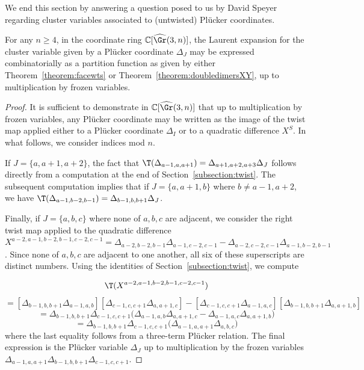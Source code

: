 We end this section by answering a question posed to us by David Speyer regarding cluster variables associated to (untwisted) Pl\"ucker coordinates.

\begin{prop}
\label{prop:untwisted}
For any $n\geq 4$, in the coordinate ring $\mathbb{C}[\widehat{\Gr}(3,n)]$, the Laurent expansion for the cluster variable given by a Pl\"ucker coordinate $\Delta_J$ may be expressed combinatorially as a partition function as given by either Theorem~\ref{theorem:facewts} or Theorem~\ref{theorem:doubledimersXY}, up to multiplication by frozen variables.
\end{prop}
\begin{proof}
It is sufficient to demonstrate in $\mathbb{C}[\widehat{\Gr}(3,n)]$  that up to multiplication by frozen variables, any Pl\"ucker coordinate may be written as the image of the twist map applied either to a Pl\"ucker coordinate $\Delta_I$ or to a quadratic difference $X^S$. In what follows, we consider indices mod $n$.

If $J=\{a,a+1,a+2\}$, the fact that $\T(\Delta_{a-1,a,a+1})=\Delta_{a+1,a+2,a+3}\Delta_J$ follows directly from a computation at the end of Section~\ref{subsection:twist}.
The subsequent computation implies that if $J=\{a,a+1,b\}$ where $b \neq a-1,a+2$, we have $\T(\Delta_{a-1,b-2,b-1})=\Delta_{b-1,b,b+1}\Delta_J$.

Finally, if $J=\{a,b,c\}$ where none of $a,b,c$ are adjacent, we consider the right twist map applied to the quadratic difference 
$X^{a-2,a-1,b-2,b-1,c-2,c-1} = \Delta_{a-2,b-2,b-1} \Delta_{a-1,c-2,c-1} - \Delta_{a-2,c-2,c-1} \Delta_{a-1,b-2,b-1}$.  Since none of $a,b,c$ are adjacent to one another, all six of these superscripts are distinct numbers.  Using the identities of Section~\ref{subsection:twist}, we compute

\[\T(X^{a-2,a-1,b-2,b-1,c-2,c-1}) \]\[= [\Delta_{b-1,b,b+1} \Delta_{a-1,a,b}] [\Delta_{c-1,c,c+1} \Delta_{a,a+1,c}] - [\Delta_{c-1,c,c+1} \Delta_{a-1,a,c}] [\Delta_{b-1,b,b+1} \Delta_{a,a+1,b}] \]\[= \Delta_{b-1,b,b+1}\Delta_{c-1,c,c+1} \bigg( \Delta_{a-1,a,b}\Delta_{a,a+1,c} - \Delta_{a-1,a,c}\Delta_{a,a+1,b}\bigg) \]\[= \Delta_{b-1,b,b+1}\Delta_{c-1,c,c+1} \bigg( \Delta_{a-1,a,a+1} \Delta_{a,b,c}\bigg)\]
where the last equality follows from a three-term Pl{\"u}cker relation. The final expression is the Pl\"ucker variable $\Delta_J$ up to multiplication by the frozen variables
$\Delta_{a-1,a,a+1} \Delta_{b-1,b,b+1}\Delta_{c-1,c,c+1}$.
\end{proof}


